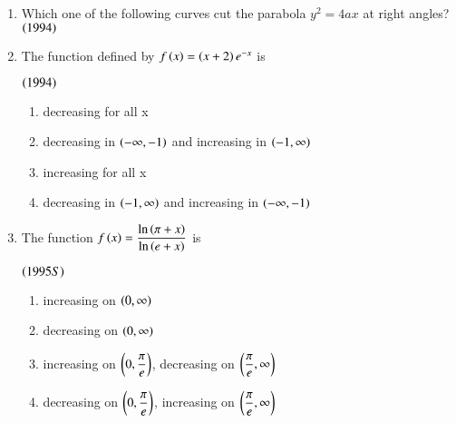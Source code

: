 \documentclass[journal,12pt,twocolumn]{IEEEtran}
\theoremstyle{remark}
\begin{document}
\begin{enumerate}
\begin{enumerate}[label=\alph*.]
\end{enumerate}

        \item Which one of the following curves cut the parabola
$y^2 = 4ax$ at right angles?\hfill$\left(1994\right)$

\begin{enumerate}[label=\alph*.]
\end{enumerate}

        \item The function defined by $f\left(x\right) = \left(x+2\right)e^{-x}$ is

		\hfill$\left(1994\right)$

\begin{enumerate}[label=\alph*.]
	\item decreasing for all x
	\item decreasing in $\left(-\infty, -1\right)$ and increasing
		in $\left(-1, \infty\right)$
        \item increasing for all x
	\item decreasing in $\left(-1, \infty\right)$ and increasing
		in $\left(-\infty, -1\right)$\\
\end{enumerate}

        \item The function $f\left(x\right) = 
\displaystyle\frac{\ln \left(\pi + x\right)}{\ln \left(e + x\right)}$ is

                               \hfill$\left(1995S\right)$\\

\begin{enumerate}[label=\alph*.]
	\item increasing on $\left(0, \infty\right)$
	\item decreasing on $\left(0, \infty\right)$
	\item increasing on $\left(0, \displaystyle\frac{\pi}{e}\right)$,
		decreasing on $\left(\displaystyle\frac{\pi}{e}, \infty\right)$
	\item decreasing on $\left(0, \displaystyle\frac{\pi}{e}\right)$,
		increasing on $\left(\displaystyle\frac{\pi}{e}, \infty\right)$\\
\end{enumerate}


\end{enumerate}
\end{document}
